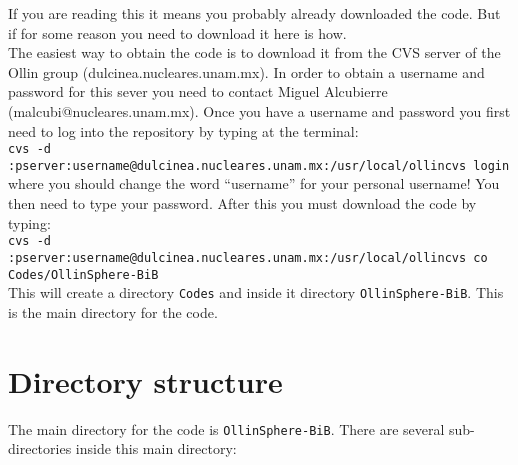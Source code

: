 \documentclass[12pt]{article}
\begin{document}
If you are reading this it means you probably already downloaded the
code.  But if for some reason you need to download it here is how. \\

The easiest way to obtain the code is to download it from the CVS
server of the Ollin group (dulcinea.nucleares.unam.mx).  In order to
obtain a username and password for this sever you need to contact
Miguel Alcubierre (malcubi@nucleares.unam.mx). Once you have a
username and password you first need to log into the repository by
typing at the terminal: \\

\texttt{\footnotesize cvs -d
  :pserver:username@dulcinea.nucleares.unam.mx:/usr/local/ollincvs
  login} \\

where you should change the word ``username'' for your personal
username! You then need to type your password.  After this you must
download the code by typing: \\

\texttt{\footnotesize cvs -d
  :pserver:username@dulcinea.nucleares.unam.mx:/usr/local/ollincvs co
  Codes/OllinSphere-BiB} \\

This will create a directory \texttt{Codes} and inside it directory
\texttt{OllinSphere-BiB}. This is the main directory for the code.

\pagebreak



\section{Directory structure}

The main directory for the code is \texttt{OllinSphere-BiB}.  There are
several sub-directories inside this main directory:
\end{document}

